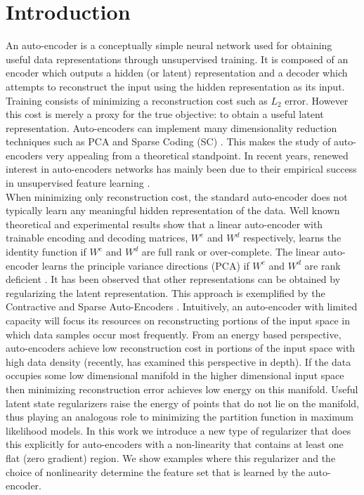 
\section{Introduction} An auto-encoder is a conceptually simple
neural network used for obtaining useful data representations through
unsupervised training. It is composed of an encoder which outputs a hidden (or
latent) representation and a decoder which attempts to reconstruct the input
using the hidden representation as its input. Training consists of minimizing a
reconstruction cost such as $L_2$ error. However this cost is merely a proxy
for the true objective: to obtain a useful latent representation. Auto-encoders
can  implement many dimensionality reduction techniques such as PCA and Sparse
Coding (SC) \cite{DHS}\cite{SC}\cite{LISTA}. This makes the study of
auto-encoders very appealing from a theoretical standpoint. In recent years,
renewed interest in auto-encoders networks has mainly been due to their
empirical success in unsupervised feature learning
\cite{SAE1}\cite{SAE2}\cite{CAE}\cite{DAE}. \\

\noindent When minimizing only reconstruction cost, the standard auto-encoder
does not typically learn any meaningful hidden representation of the data. Well
known theoretical and experimental results show that a linear auto-encoder with
trainable encoding and decoding matrices, $W^e$ and $W^d$ respectively, learns
the identity function if $W^e$ and $W^d$ are full rank or over-complete. The
linear auto-encoder learns the principle variance directions (PCA) if $W^e$ and
$W^d$ are rank deficient \cite{DHS}. It has been observed that other
representations can be obtained by regularizing the latent representation. This
approach is exemplified by the Contractive and Sparse Auto-Encoders \cite{CAE}
\cite{SAE1} \cite{SAE2}. Intuitively, an auto-encoder with limited capacity
will focus its resources on reconstructing portions of the input space in which
data samples occur most frequently. From an energy based perspective,
auto-encoders achieve low reconstruction cost in portions of the input space
with high data density (recently, \cite{bengio_new} has examined this
perspective in depth). If the data occupies some low dimensional manifold in
the higher dimensional input space then minimizing reconstruction error
achieves low energy on this manifold. Useful latent state regularizers raise
the energy of points that do not lie on the manifold, thus playing an analogous
role to minimizing the partition function in maximum likelihood models. In this
work we introduce a new type of regularizer that does this explicitly for
auto-encoders with a non-linearity that contains at least one flat (zero
gradient) region. We show examples where this regularizer and the choice of
nonlinearity determine the feature set that is learned by the auto-encoder.      

